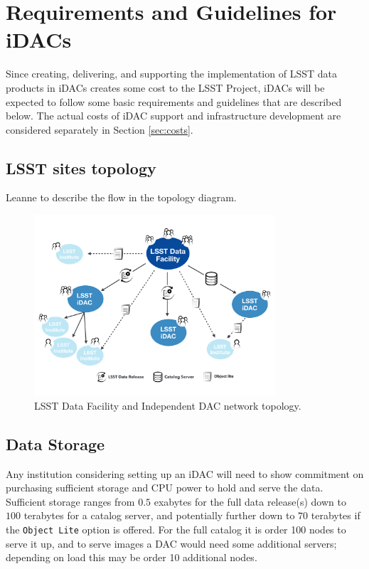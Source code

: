 \section{Requirements and Guidelines for iDACs}\label{sec:reqs}

Since creating, delivering, and supporting the implementation of LSST data products in iDACs creates some cost to the LSST Project, iDACs will be expected to follow some basic requirements and guidelines that are described below. 
The actual costs of iDAC support and infrastructure development are considered separately in Section \ref{sec:costs}.

\subsection{LSST sites topology} \label{sec:topology}

{\color{red}Leanne to describe the flow in the topology diagram.} \newline

\begin{figure}
\begin{center}
\includegraphics[width=0.8\textwidth]{images_local/LSST-site-topology.pdf}
\caption{LSST Data Facility and Independent DAC network topology.  \label{fig:lsst-site-topology}}
\end{center}
\end{figure}

\subsection{Data Storage}
Any institution considering setting up an iDAC will need to show commitment on purchasing sufficient storage and CPU power to hold and serve the data. Sufficient storage ranges from $0.5$ exabytes for the full data release(s) down to $100$ terabytes for a catalog server, and potentially further down to $70$ terabytes if the {\tt Object Lite} option is offered. For the full catalog it is order 100 nodes to serve it up, and to serve images a DAC would need some additional servers; depending on load this may be order 10 additional nodes.

